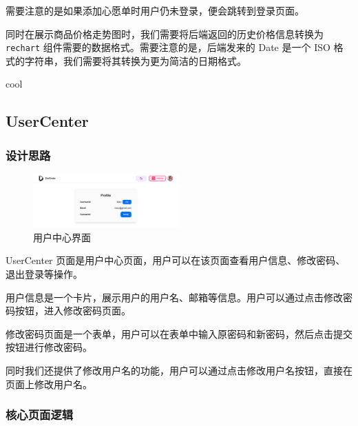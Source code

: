 需要注意的是如果添加心愿单时用户仍未登录，便会跳转到登录页面。

同时在展示商品价格走势图时，我们需要将后端返回的历史价格信息转换为 \texttt{rechart} 组件需要的数据格式。需要注意的是，后端发来的 Date 是一个 ISO 格式的字符串，我们需要将其转换为更为简洁的日期格式。

\begin{codebox}{}{cool}
\end{codebox}

\subsection{UserCenter}

\subsubsection{设计思路}

\begin{figure}[H]
\centering
\includegraphics[width=0.5\textwidth]{assets/report/user_page.png}
\caption{用户中心界面}
\end{figure}

UserCenter 页面是用户中心页面，用户可以在该页面查看用户信息、修改密码、退出登录等操作。

用户信息是一个卡片，展示用户的用户名、邮箱等信息。用户可以通过点击修改密码按钮，进入修改密码页面。

修改密码页面是一个表单，用户可以在表单中输入原密码和新密码，然后点击提交按钮进行修改密码。

同时我们还提供了修改用户名的功能，用户可以通过点击修改用户名按钮，直接在页面上修改用户名。

\subsubsection{核心页面逻辑}

